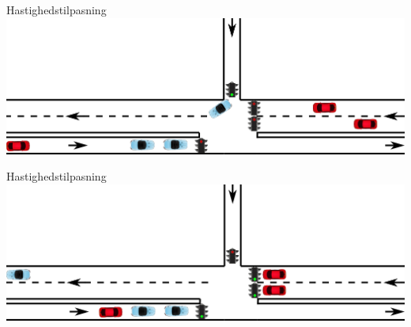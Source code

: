 \begin{frame}{Hastighedstilpasning}
\includegraphics[width=1\textwidth]{images/eks1.png}
\end{frame}

\begin{frame}{Hastighedstilpasning}
\includegraphics[width=1\textwidth]{images/eks2.png}
\end{frame}

